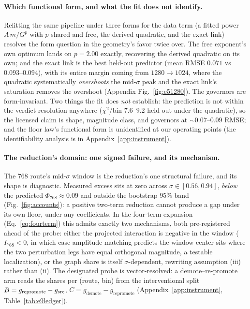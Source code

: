 \paragraph{Which functional form, and what the fit does not identify.}
Refitting the same pipeline under three forms for the data term (a
fitted power $A\,m/G^p$ with $p$ shared and free, the derived
quadratic, and the exact link) resolves the form question in the
geometry's favor twice over. The free exponent's own optimum lands on
$p = 2.00$ exactly, recovering the derived quadratic on its own; and
the exact link is the best held-out predictor (mean RMSE $0.071$ vs
$0.093$--$0.094$), with its entire margin coming from $1280{\to}1024$,
where the quadratic systematically \emph{overshoots} the mid-$\sigma$
peak and the exact link's saturation removes the overshoot (Appendix
Fig.~\ref{fig:e51280}). The governors are form-invariant. Two things
the fit does \emph{not} establish: the prediction is not within
the verdict resolution anywhere ($\chi^2$/bin $7.6$--$9.2$ held-out
under the quadratic), so the licensed claim is shape, magnitude class,
and governors at ${\sim}0.07$--$0.09$ RMSE; and the floor law's
functional form is unidentified at our operating points
(the identifiability analysis is in Appendix~\ref{app:instrument}).

\paragraph{The reduction's domain: one signed failure, and its
mechanism.}
The $768$ route's mid-$\sigma$ window is the reduction's one structural
failure, and its shape is diagnostic. Measured excess sits at zero
across $\sigma \in [0.56, 0.94]$, \emph{below} the predicted
$\Phi_{768} \approx 0.09$ and outside the bootstrap $95\%$ band
(Fig.~\ref{fig:accounts}): a positive two-term reduction cannot produce a gap
under its own floor, under any coefficients. In the four-term expansion
(Eq.~\ref{eq:fourterm}) this admits exactly two mechanisms, both
pre-registered ahead of the probe: either the projected interaction
is negative in the window ($I_{768} < 0$, in which case amplitude
matching predicts the window center sits where the two perturbation
legs have equal orthogonal magnitude, a testable localization), or the
graph share is itself $\sigma$-dependent, rewriting assumption (iii)
rather than (ii). The designated probe is vector-resolved: a
demote--re-promote arm reads the shares per (route, bin) from the
interventional split $B = \bar g_{\mathrm{repromote}} - \bar g_{\mathrm{src}}$,
$C = \bar g_{\mathrm{demote}} - \bar g_{\mathrm{repromote}}$
(Appendix~\ref{app:instrument}, Table~\ref{tab:e9ledger}).


